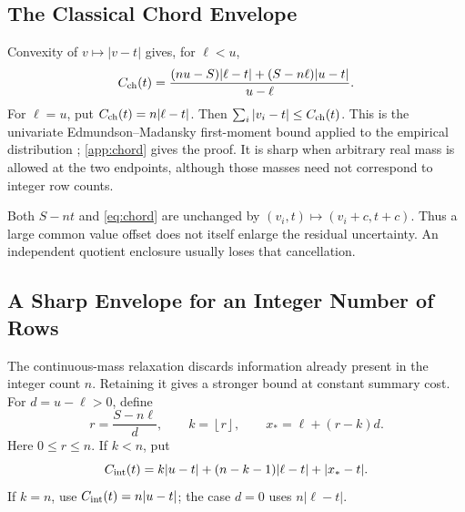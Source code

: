\documentclass{article}
\theoremstyle{plain}
\theoremstyle{definition}
\theoremstyle{remark}
\newcommand{\floor}[1]{\left\lfloor#1\right\rfloor}
\begin{document}
\subsection{The Classical Chord Envelope}

Convexity of $v\mapsto|v-t|$ gives, for $\ell<u$,
\begin{equation}
 C_{\rm ch}(t)=
 \frac{(nu-S)|\ell-t|+(S-n\ell)|u-t|}{u-\ell}.
 \label{eq:chord}
\end{equation}
For $\ell=u$, put $C_{\rm ch}(t)=n|\ell-t|$. Then
$\sum_i|v_i-t|\le C_{\rm ch}(t)$. This is the univariate
Edmundson--Madansky first-moment bound applied to the empirical distribution
\citep{edmundson1957,madansky1959}; \cref{app:chord} gives the proof.
It is sharp when arbitrary real mass is allowed at the two endpoints,
although those masses need not correspond to integer row counts.

Both $S-nt$ and \cref{eq:chord} are unchanged by
$(v_i,t)\mapsto(v_i+c,t+c)$. Thus a large common value offset does not
itself enlarge the residual uncertainty. An independent quotient enclosure
usually loses that cancellation.

\subsection{A Sharp Envelope for an Integer Number of Rows}
\label{sec:integer}

The continuous-mass relaxation discards information already present in the
integer count $n$. Retaining it gives a stronger bound at constant summary
cost. For $d=u-\ell>0$, define
\begin{equation}
 r=\frac{S-n\ell}{d},\qquad k=\floor{r},\qquad
 x_* =\ell+(r-k)d.
 \label{eq:integerparams}
\end{equation}
Here $0\le r\le n$. If $k<n$, put
\begin{equation}
 C_{\rm int}(t)=k|u-t|+(n-k-1)|\ell-t|+|x_*-t|.
 \label{eq:integer}
\end{equation}
If $k=n$, use $C_{\rm int}(t)=n|u-t|$; the case $d=0$ uses
$n|\ell-t|$.
\end{document}
